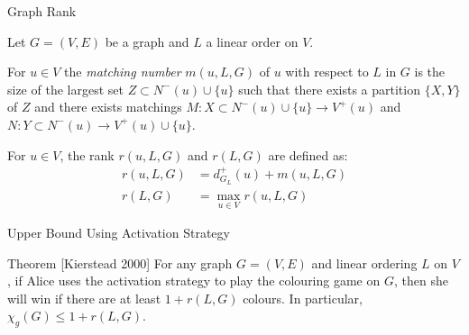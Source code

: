 \documentclass[handout]{beamer}
\begin{document}
\begin{frame}{\secname}{Graph Rank}
    
    
    
%    
    
      
    Let $G=(V,E)$ be a graph and $L$ a linear order on $V$.
    
    \begin{definition} 
    For $u \in V$ the \textit{matching number} $m(u, L, G)$ of $u$ with respect to $L$ in $G$ is the size of the largest set $Z \subset N^-(u)\cup\{u\}$ such that there exists a partition $\{X, Y\}$ of $Z$ and there exists matchings $M:X\subset N^-(u)\cup\{u\} \to V^+(u)$ and $N:Y\subset N^-(u)\to V^+(u)\cup\{u\}$.
    \end{definition}
    
    \pause
    
    \begin{definition}[Rank]
    For $u\in V$, the rank $r(u,L,G)$ and $r(L,G)$ are defined as:
    \begin{align*}
    r(u,L,G) & = d^+_{G_L}(u) + m(u,L,G) \\
    r(L,G)   & = \max_{u \in V}r(u,L,G)  
    \end{align*}
\end{definition}
\end{frame}


\begin{frame}{\secname}{Upper Bound Using Activation Strategy}
    
    \begin{block}{Theorem [Kierstead 2000]}
        For any graph $G=(V,E)$ and linear ordering $L$ on $V$, if Alice uses the activation strategy to play the colouring game on $G$, then she will win if there are at least $1+r(L, G)$ colours. In particular, $\chi_g(G) \leq 1+r(L, G)$.
    \end{block}
\end{frame}
\end{document}
